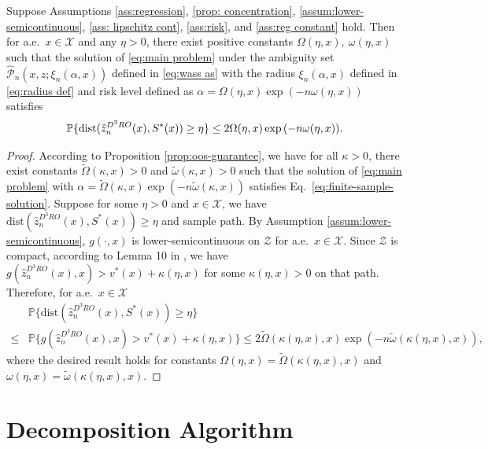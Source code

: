 \documentclass[onefignum,onetabnum]{siamart251216}
\begin{document}
\begin{theorem}\label{thm:fssg}
 Suppose Assumptions \ref{ass:regression}, \ref{prop: concentration}, \ref{assum:lower-semicontinuous}, \ref{ass: lipschitz cont}, \ref{ass:risk}, and \ref{ass:reg constant} hold. Then for a.e.\ $x \in \mathcal{X}$ and any $\eta >0$, there exist positive constants $\Omega(\eta,x),\ \omega(\eta,x)$ such that the solution of \eqref{eq:main problem} under the ambiguity set $\hat{\mathcal{P}}_n(x,z;\xi_n(\alpha,x))$ defined in \eqref{eq:wass as} with the radius $\xi_n(\alpha,x)$ defined in \eqref{eq:radius def} and risk level defined as $\alpha ={\Omega}(\eta,x)\exp(-n{\omega}(\eta,x)) $ satisfies 
 \begin{align*}
     \mathbb{P}\{{\rm{dist}}(\hat{z}_n^{D^3RO}(x), S^*(x)) \geq \eta \} \leq 2\Omega(\eta,x)\exp{(-n \omega(\eta,x))}.
 \end{align*}

\end{theorem}
\begin{proof}
According to Proposition \ref{prop:oos-guarantee}, we have for all $\kappa >0$, there exist constants $\tilde{\Omega}(\kappa,x)>0$ and $\tilde{\omega}(\kappa,x)>0$ such that the solution of \eqref{eq:main problem}  with $\alpha = \tilde{\Omega}(\kappa,x)\exp(-n\tilde{\omega}(\kappa,x))$ satisfies Eq.~\eqref{eq:finite-sample-solution}. Suppose for some $\eta>0$ and $x\in\mathcal{X}$, we have $\text{dist} (\hat{z}_n^{D^3RO}(x),S^*(x)) \geq \eta$ and sample path. By Assumption \ref{assum:lower-semicontinuous}, $g(\cdot, x)$ is lower-semicontinuous on $\mathcal{Z}$ for a.e.\ $x\in\mathcal{X}$. Since $\mathcal{Z}$ is compact, according to Lemma 10 in \cite{kannan2025data}, we have $g(\hat{z}_n^{D^3RO}(x),x) > v^*(x) + \kappa(\eta,x)$ for some $\kappa(\eta,x)>0$ on that path. Therefore, for a.e.\ $x \in \mathcal{X}$
\begin{align*}
    & \mathbb{P}\{\text{dist}(\hat{z}_n^{D^3RO}(x),S^*(x)) \geq \eta\} \\
    \leq & \mathbb{P}\{g(\hat{z}_n^{D^3RO}(x),x) > v^*(x) + \kappa(\eta,x)\} 
    \leq  2\tilde{\Omega}(\kappa(\eta,x),x)\exp(-n\tilde{\omega}(\kappa(\eta,x),x)),
\end{align*}
where the desired result holds for constants $\Omega(\eta,x)=\tilde{\Omega}(\kappa(\eta,x),x)$ and $\omega(\eta,x)=\tilde{\omega}(\kappa(\eta,x),x).$
\end{proof}


\section{Decomposition Algorithm}
\label{sec:decomp}
\end{document}
